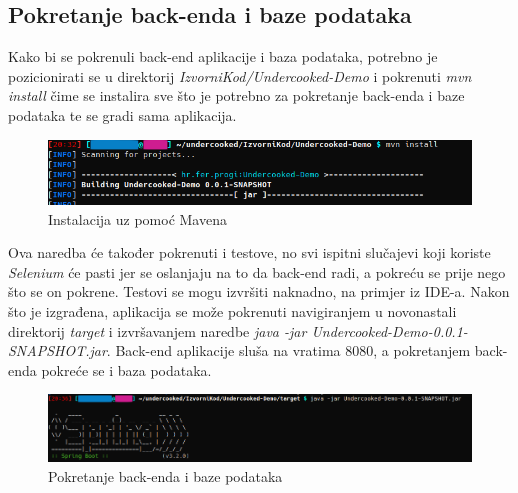 			\subsection{Pokretanje back-enda i baze podataka}
			Kako bi se pokrenuli back-end aplikacije i baza podataka, potrebno je pozicionirati se u direktorij \textit{IzvorniKod/Undercooked-Demo} i pokrenuti \textit{mvn install} čime se instalira sve što je potrebno za pokretanje back-enda i baze podataka te se gradi sama aplikacija.
			\begin{figure}[H]
				\includegraphics[scale=0.8]{slike/instalacija_5.png} %
				\centering
				\caption{Instalacija uz pomoć Mavena}
				\label{fig:Instalacija uz pomoć Mavena}
			\end{figure}
			Ova naredba će također pokrenuti i testove, no svi ispitni slučajevi koji koriste \textit{Selenium} će pasti jer se oslanjaju na to da back-end radi, a pokreću se prije nego što se on pokrene. Testovi se mogu izvršiti naknadno, na primjer iz IDE-a. Nakon što je izgrađena, aplikacija se može pokrenuti navigiranjem u novonastali direktorij \textit{target} i izvršavanjem naredbe \textit{java -jar Undercooked-Demo-0.0.1-SNAPSHOT.jar}. Back-end aplikacije sluša na vratima 8080, a pokretanjem back-enda pokreće se i baza podataka.
			\begin{figure}[H]
				\includegraphics[scale=0.55]{slike/instalacija_6.png} %
				\centering
				\caption{Pokretanje back-enda i baze podataka}
				\label{fig:Pokretanje back-enda i baze podataka}
			\end{figure}
			\eject 